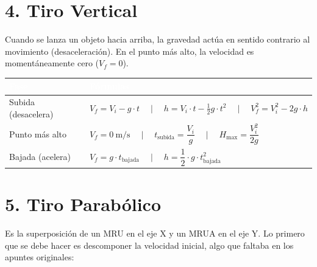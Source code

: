 \documentclass[10pt,a4paper]{article}
\begin{document}
\section{4. Tiro Vertical}

Cuando se lanza un objeto hacia arriba, la gravedad actúa en sentido contrario al movimiento (desaceleración). En el punto más alto, la velocidad es momentáneamente cero ($V_f = 0$).

\vspace{4pt}
\begin{tabularx}{\textwidth}{LL}
  \toprule
  \textbf{\textcolor{white}{Fase}} &
  \textbf{\textcolor{white}{Fórmulas}} \\
  \midrule
  Subida (desacelera) &
  $V_f = V_i - g \cdot t \quad\mid\quad
   h = V_i \cdot t - \frac{1}{2} g \cdot t^2 \quad\mid\quad
   V_f^2 = V_i^2 - 2 g \cdot h$ \\
  Punto más alto &
  $V_f = 0\ \text{m/s} \quad\mid\quad
   t_{\text{subida}} = \dfrac{V_i}{g} \quad\mid\quad
   H_{\text{max}} = \dfrac{V_i^2}{2g}$ \\
  Bajada (acelera) &
  $V_f = g \cdot t_{\text{bajada}} \quad\mid\quad
   h = \dfrac{1}{2} \cdot g \cdot t_{\text{bajada}}^2$ \\
  \bottomrule
\end{tabularx}
\vspace{12pt}

\section{5. Tiro Parabólico}

Es la superposición de un MRU en el eje X y un MRUA en el eje Y. Lo primero que se debe hacer es descomponer la velocidad inicial, algo que faltaba en los apuntes originales:
\end{document}

